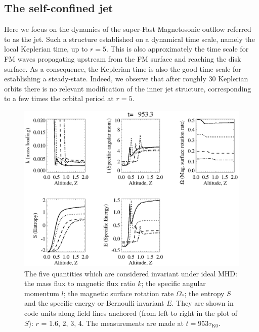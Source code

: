 \documentclass{aa}
\begin{document}
\subsection{The self-confined jet}

Here we focus on the dynamics of the super-Fast Magnetosonic outflow referred to as the jet. Such a structure established on a dynamical time scale, namely the local Keplerian time, up to $r=5$. This
is also approximately the time scale for FM waves propagating upstream from the FM surface and reaching the disk surface. As a consequence, the Keplerian time is also the good time scale for
establishing a steady-state. Indeed, we observe that after roughly 30 Keplerian orbits there is no relevant modification of the inner jet structure, corresponding to a few times the orbital period at
$r=5$.

  \begin{figure}
   \sidecaption
     \includegraphics[width=12cm]{12633f09.eps}
\caption{The five quantities which are considered invariant under ideal MHD: the mass flux to magnetic flux ratio $k$; the specific angular momentum $l$; the magnetic surface rotation rate
$\Omega_*$; the entropy $S$ and the specific energy or Bernoulli invariant $E$. They are shown in code units along field lines anchored (from left to right in the plot of $S$): $r$ = 1.6, 2, 3, 4. The
measurements are made at $t=953 \tau_\mathrm{K0}$.}
              \label{invar}%
    \end{figure}
\end{document}
